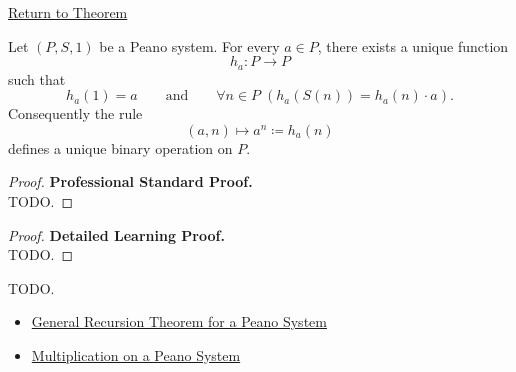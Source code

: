 \newpage
{}
\label{prf:exponentiation-well-defined-on-peano-system}

\begin{remark*}[Return]
\hyperref[thm:exponentiation-well-defined-on-peano-system]{Return to Theorem}
\end{remark*}

\begin{theorem*}
Let $(P,S,1)$ be a Peano system. For every $a \in P$, there exists a unique
function
\[
h_a:P\to P
\]
such that
\[
h_a(1)=a
\qquad\text{and}\qquad
\forall n \in P\;(h_a(S(n))=h_a(n)\cdot a).
\]
Consequently the rule
\[
(a,n)\longmapsto a^n\coloneqq h_a(n)
\]
defines a unique binary operation on $P$.
\end{theorem*}

\begin{proof}
\textbf{Professional Standard Proof.}~\\
TODO.
\end{proof}

\begin{proof}
\textbf{Detailed Learning Proof.}~\\
TODO.
\end{proof}

\begin{remark*}
TODO.
\end{remark*}

\begin{dependencies}
\begin{itemize}
  \item \hyperref[thm:general-recursion-theorem-for-peano-system]{General Recursion Theorem for a Peano System}
  \item \hyperref[def:multiplication-on-peano-system]{Multiplication on a Peano System}
\end{itemize}
\end{dependencies}
